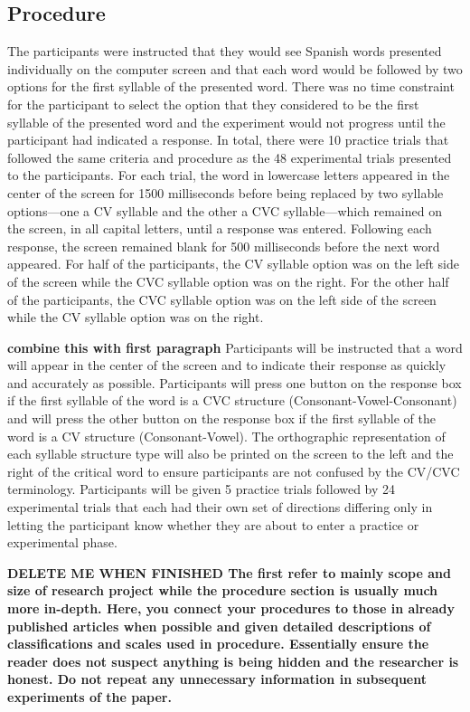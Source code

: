 
\subsection{Procedure}

The participants were instructed that they would see Spanish words presented individually on the computer screen and that each word would be followed by two options for the first syllable of the presented word. There was no time constraint for the participant to select the option that they considered to be the first syllable of the presented word and the experiment would not progress until the participant had indicated a response. In total, there were 10 practice trials that followed the same criteria and procedure as the 48 experimental trials presented to the participants. For each trial, the word in lowercase letters appeared in the center of the screen for 1500 milliseconds before being replaced by two syllable options---one a CV syllable and the other a CVC syllable---which remained on the screen, in all capital letters, until a response was entered. Following each response, the screen remained blank for 500 milliseconds before the next word appeared. For half of the participants, the CV syllable option was on the left side of the screen while the CVC syllable option was on the right. For the other half of the participants, the CVC syllable option was on the left side of the screen while the CV syllable option was on the right.


\textbf{combine this with first paragraph}
Participants will be instructed that a word will appear in the center of the screen and to indicate their response as quickly and accurately as possible. Participants will press one button on the response box if the first syllable of the word is a CVC structure (Consonant-Vowel-Consonant) and will press the other button on the response box if the first syllable of the word is a CV structure (Consonant-Vowel). The orthographic representation of each syllable structure type will also be printed on the screen to the left and the right of the critical word to ensure participants are not confused by the CV/CVC terminology. Participants will be given 5 practice trials followed by 24 experimental trials that each had their own set of directions differing only in letting the participant know whether they are about to enter a practice or experimental phase.

\textbf{DELETE ME WHEN FINISHED
The first refer to mainly scope and size of research project while the procedure section is usually much more in-depth. Here, you connect your procedures to those in already published articles when possible and given detailed descriptions of classifications and scales used in procedure. Essentially ensure the reader does not suspect anything is being hidden and the researcher is honest. Do not repeat any unnecessary information in subsequent experiments of the paper.}


